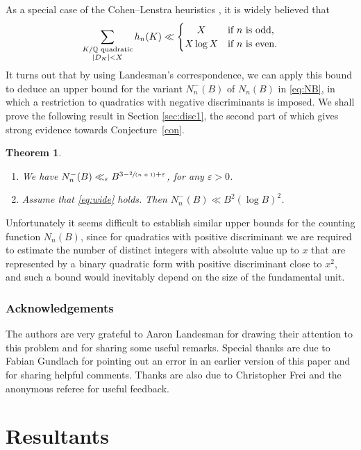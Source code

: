 \documentclass[11pt]{article}
\newcommand{\skpt}{\smallskip}
\newcommand{\spfrac}[2]{\sfrac{#1}{(#2)}}
\newcommand{\QQ}{\mathbb{Q}}\let\Q\QQ
\let\ve\varepsilon
\newtheorem{theorem}{Theorem}[section]
\numberwithin{equation}{section}
\begin{document}
As a special case of the Cohen--Lenstra heuristics \cite{CL},
it is widely believed that
\begin{equation}\label{eq:wide}
\sum_{
\substack{K/\QQ \text{ quadratic}\\
|D_K|<X
}} h_n(K)\ll
\begin{cases}
\hfil X&\text{if $n$ is odd},\\
\hfil X\log X&\text{if $n$ is even}.
\end{cases}
\end{equation}
It turns out that by using Landesman's correspondence, we can
apply this bound to deduce an upper bound for the variant $N_n^-(B)$ of $N_n(B)$ in \eqref{eq:NB}, in which a restriction to quadratics with
negative discriminants is imposed.
We shall prove the following result in Section \ref{sec:disc1}, the second part of which gives strong evidence towards Conjecture~\ref{con}.

\skpt
\begin{theorem}\label{t:lama}
\begin{enumerate}
\item
We have $N_n^-(B)\ll_\ve
B^{3-\spfrac{2}{n+1}+\ve}$,
for any $\ve>0$.
\item
Assume that \eqref{eq:wide} holds. Then $N_n^-(B)\ll B^2(\log B)^2$.
\end{enumerate}
\end{theorem}

Unfortunately it seems difficult to establish similar upper bounds for the counting function $N_n(B)$, since for quadratics with positive discriminant we are required to
estimate the number of distinct integers with absolute value up to $x$ that are represented by a binary quadratic form with positive discriminant close to $x^2$, and such a bound would inevitably depend on the size of the fundamental unit.

\subsubsection*{Acknowledgements}
The authors are very grateful to Aaron Landesman
for drawing their attention to this problem and for sharing some useful remarks.
Special thanks are due to Fabian Gundlach for pointing out an error in an earlier version of this paper and for sharing helpful comments. Thanks are also due to
Christopher Frei and the anonymous referee for useful feedback.

\section{Resultants}
\end{document}
